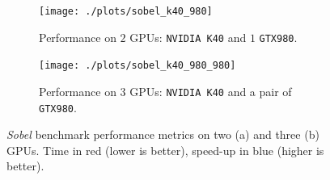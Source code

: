 \begin{figure}
    \begin{subfigure}{1.0\textwidth}
        \caption{Performance on $2$ GPUs: \texttt{NVIDIA K40} and $1$ \texttt{GTX980}.}
        \texttt{[image: ./plots/sobel\_k40\_980]}
        \label{fig:sobel_k40_980}
    \end{subfigure}        
    \endminipage \hfill
    \vspace{5mm}
    \begin{subfigure}{1.0\textwidth}
        \texttt{[image: ./plots/sobel\_k40\_980\_980]}
        \caption{Performance on $3$ GPUs: \texttt{NVIDIA K40} and a pair of \texttt{GTX980}.}
        \label{fig:sobel_k40_980_980}
    \end{subfigure}
    \endminipage\hfill
    \caption[Sobel benchmark performance metrics.]{\textit{Sobel} benchmark performance metrics on two (a) and three (b) GPUs. Time in red (lower is better), speed-up in blue (higher is better).}
    \label{fig:sobel_performance_charts}
\end{figure}
